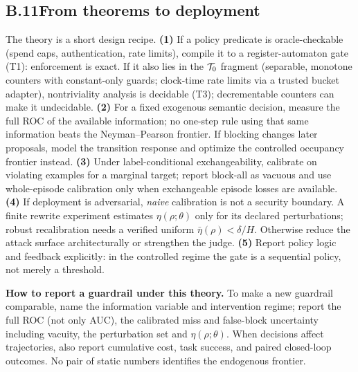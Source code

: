 \subsection*{B.11\quad From theorems to deployment}
The theory is a short design recipe.
\textbf{(1)} If a policy predicate is oracle-checkable (spend caps, authentication,
rate limits), compile it to a register-automaton gate (T1): enforcement is exact. If
it also lies in the $\mathcal{T}_0$ fragment (separable, monotone counters with constant-only
guards; clock-time rate limits via a trusted bucket adapter), nontriviality analysis
is decidable (T3); decrementable counters can make it undecidable.
\textbf{(2)} For a fixed exogenous semantic decision, measure the full ROC of
the available information; no one-step rule using that same information beats
the Neyman--Pearson frontier. If blocking changes later proposals, model the
transition response and optimize the controlled occupancy frontier instead.
\textbf{(3)} Under label-conditional exchangeability, calibrate on violating
examples for a marginal target; report block-all as vacuous and use
whole-episode calibration only when exchangeable episode losses are available.
\textbf{(4)} If deployment is adversarial, \emph{naive} calibration is not a security
boundary. A finite rewrite experiment estimates
$\eta(\rho;\theta)$ only for its declared perturbations; robust recalibration
needs a verified uniform $\bar\eta(\rho)<\delta/H$. Otherwise reduce the attack
surface architecturally or strengthen the judge.
\textbf{(5)} Report policy logic and feedback explicitly: in the controlled
regime the gate is a sequential policy, not merely a threshold.

\smallskip\noindent\textbf{How to report a guardrail under this theory.} To make a new
guardrail comparable, name the information variable and intervention regime;
report the full ROC (not only AUC), the calibrated miss and false-block
uncertainty including vacuity, the perturbation set and
$\eta(\rho;\theta)$. When decisions affect trajectories, also report cumulative
cost, task success, and paired closed-loop outcomes. No pair of static numbers
identifies the endogenous frontier.

